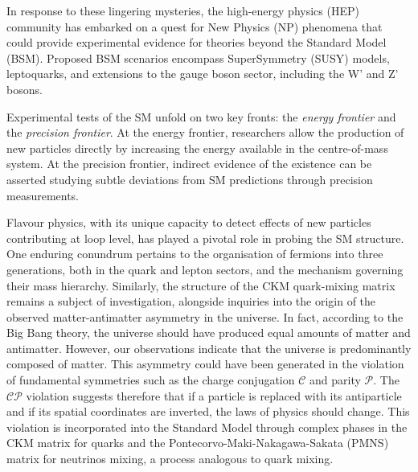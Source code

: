 In response to these lingering mysteries, the high-energy physics (HEP) community has embarked on a quest for New Physics (NP) phenomena that could provide experimental evidence for theories beyond the Standard Model (BSM).
Proposed BSM scenarios encompass SuperSymmetry (SUSY) models, leptoquarks, and extensions to the gauge boson sector, including the W’ and Z’ bosons.

Experimental tests of the SM unfold on two key fronts: the \textit{energy frontier} and the \textit{precision frontier}. At the energy frontier, researchers allow the production of new particles directly by increasing the energy available in the centre-of-mass system. At the precision frontier, indirect evidence of the existence can be asserted studying subtle deviations from SM predictions through precision measurements. 

Flavour physics, with its unique capacity to detect effects of new particles contributing at loop level, has played a pivotal role in probing the SM structure. One enduring conundrum pertains to the organisation of fermions into three generations, both in the quark and lepton sectors, and the mechanism governing their mass hierarchy. Similarly, the structure of the CKM quark-mixing matrix remains a subject of investigation, alongside inquiries into the origin of the observed matter-antimatter asymmetry in the universe. In fact, according to the Big Bang theory, the universe should have produced equal amounts of matter and antimatter. However, our observations indicate that the universe is predominantly composed of matter. This asymmetry could have been generated in the violation of fundamental symmetries such as the charge conjugation $\mathcal{C}$ and parity $\mathcal{P}$. The $\mathcal{CP}$ violation suggests therefore that if a particle is replaced with its antiparticle and if its spatial coordinates are inverted, the laws of physics should change. This violation is incorporated into the Standard Model through complex phases in the CKM matrix for quarks and the Pontecorvo-Maki-Nakagawa-Sakata (PMNS) matrix for neutrinos mixing, a process analogous to quark mixing. 



